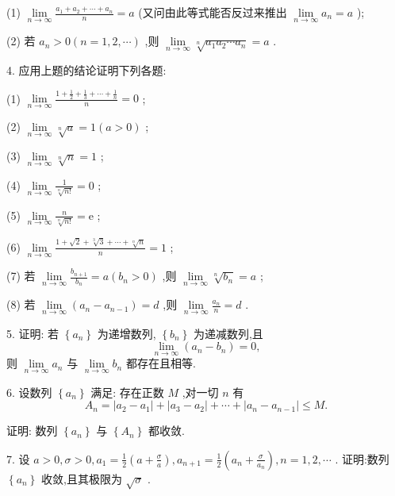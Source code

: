 (1) \(\mathop{\lim }\limits_{{n \rightarrow  \infty }}\frac{{a}_{1} + {a}_{2} + \cdots  + {a}_{n}}{n} = a\) (又问由此等式能否反过来推出 \(\mathop{\lim }\limits_{{n \rightarrow  \infty }}{a}_{n} = a\) );

(2) 若 \({a}_{n} > 0\left( {n = 1,2,\cdots }\right)\) ,则 \(\mathop{\lim }\limits_{{n \rightarrow  \infty }}\sqrt[n]{{a}_{1}{a}_{2}\cdots {a}_{n}} = a\) .

4. 应用上题的结论证明下列各题:

(1) \(\mathop{\lim }\limits_{{n \rightarrow  \infty }}\frac{1 + \frac{1}{2} + \frac{1}{3} + \cdots  + \frac{1}{n}}{n} = 0\) ;

(2) \(\mathop{\lim }\limits_{{n \rightarrow  \infty }}\sqrt[n]{a} = 1\left( {a > 0}\right)\) ;

(3) \(\mathop{\lim }\limits_{{n \rightarrow  \infty }}\sqrt[n]{n} = 1\) ;

(4) \(\mathop{\lim }\limits_{{n \rightarrow  \infty }}\frac{1}{\sqrt[n]{n!}} = 0\) ;

(5) \(\mathop{\lim }\limits_{{n \rightarrow  \infty }}\frac{n}{\sqrt[n]{n!}} = \mathrm{e}\) ;

(6) \(\mathop{\lim }\limits_{{n \rightarrow  \infty }}\frac{1 + \sqrt{2} + \sqrt[3]{3} + \cdots  + \sqrt[n]{n}}{n} = 1\) ;

(7) 若 \(\mathop{\lim }\limits_{{n \rightarrow  \infty }}\frac{{b}_{n + 1}}{{b}_{n}} = a\left( {{b}_{n} > 0}\right)\) ,则 \(\mathop{\lim }\limits_{{n \rightarrow  \infty }}\sqrt[n]{{b}_{n}} = a\) ;

(8) 若 \(\mathop{\lim }\limits_{{n \rightarrow  \infty }}\left( {{a}_{n} - {a}_{n - 1}}\right)  = d\) ,则 \(\mathop{\lim }\limits_{{n \rightarrow  \infty }}\frac{{a}_{n}}{n} = d\) .

5. 证明: 若 \(\left\{  {a}_{n}\right\}\) 为递增数列, \(\left\{  {b}_{n}\right\}\) 为递减数列,且
\[
\mathop{\lim }\limits_{{n \rightarrow  \infty }}\left( {{a}_{n} - {b}_{n}}\right)  = 0,
\]
则 \(\mathop{\lim }\limits_{{n \rightarrow  \infty }}{a}_{n}\) 与 \(\mathop{\lim }\limits_{{n \rightarrow  \infty }}{b}_{n}\) 都存在且相等.

6. 设数列 \(\left\{  {a}_{n}\right\}\) 满足: 存在正数 \(M\) ,对一切 \(n\) 有
\[
{A}_{n} = \left| {{a}_{2} - {a}_{1}}\right|  + \left| {{a}_{3} - {a}_{2}}\right|  + \cdots  + \left| {{a}_{n} - {a}_{n - 1}}\right|  \leq  M.
\]

证明: 数列 \(\left\{  {a}_{n}\right\}\) 与 \(\left\{  {A}_{n}\right\}\) 都收敛.

7. 设 \(a > 0,\sigma  > 0,{a}_{1} = \frac{1}{2}\left( {a + \frac{\sigma }{a}}\right) ,{a}_{n + 1} = \frac{1}{2}\left( {{a}_{n} + \frac{\sigma }{{a}_{n}}}\right) ,n = 1,2,\cdots\) . 证明:数列 \(\left\{  {a}_{n}\right\}\) 收敛,且其极限为 \(\sqrt{\sigma }\) .

